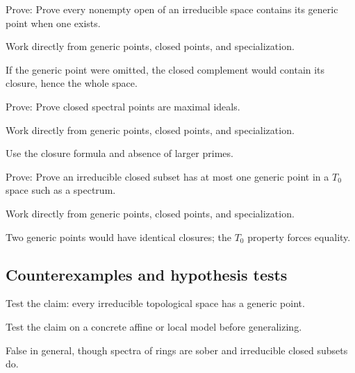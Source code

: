 \begin{exercise}\label{exr:vi09-expand-07}
Prove: Prove every nonempty open of an irreducible space contains its generic point when one exists.
\end{exercise}
\begin{hint}
Work directly from generic points, closed points, and specialization.
\end{hint}
\begin{solution}
If the generic point were omitted, the closed complement would contain its closure, hence the whole space.
\end{solution}

\begin{exercise}\label{exr:vi09-expand-08}
Prove: Prove closed spectral points are maximal ideals.
\end{exercise}
\begin{hint}
Work directly from generic points, closed points, and specialization.
\end{hint}
\begin{solution}
Use the closure formula and absence of larger primes.
\end{solution}

\begin{exercise}\label{exr:vi09-expand-09}
Prove: Prove an irreducible closed subset has at most one generic point in a $T_0$ space such as a spectrum.
\end{exercise}
\begin{hint}
Work directly from generic points, closed points, and specialization.
\end{hint}
\begin{solution}
Two generic points would have identical closures; the $T_0$ property forces equality.
\end{solution}

\subsection*{Counterexamples and hypothesis tests}

\begin{exercise}\label{exr:vi09-expand-10}
Test the claim: every irreducible topological space has a generic point.
\end{exercise}
\begin{hint}
Test the claim on a concrete affine or local model before generalizing.
\end{hint}
\begin{solution}
False in general, though spectra of rings are sober and irreducible closed subsets do.
\end{solution}

